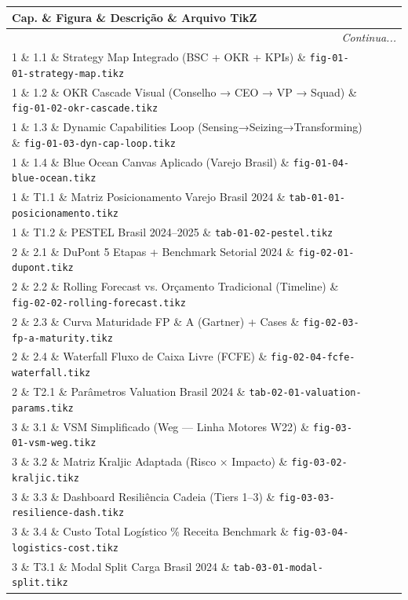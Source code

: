 \begin{longtable}{p{1.5cm}p{4cm}p{5.5cm}p{4cm}}
\toprule
\textbf{Cap.} \& \textbf{Figura} \& \textbf{Descrição} \& \textbf{Arquivo TikZ}\\
\midrule
\endhead
\midrule
\multicolumn{4}{r}{\textit{Continua...}} \\
\endfoot
\bottomrule
\endlastfoot

1 \& 1.1 \& Strategy Map Integrado (BSC + OKR + KPIs) \& \texttt{fig-01-01-strategy-map.tikz}\\
1 \& 1.2 \& OKR Cascade Visual (Conselho → CEO → VP → Squad) \& \texttt{fig-01-02-okr-cascade.tikz}\\
1 \& 1.3 \& Dynamic Capabilities Loop (Sensing→Seizing→Transforming) \& \texttt{fig-01-03-dyn-cap-loop.tikz}\\
1 \& 1.4 \& Blue Ocean Canvas Aplicado (Varejo Brasil) \& \texttt{fig-01-04-blue-ocean.tikz}\\
1 \& T1.1 \& Matriz Posicionamento Varejo Brasil 2024 \& \texttt{tab-01-01-posicionamento.tikz}\\
1 \& T1.2 \& PESTEL Brasil 2024–2025 \& \texttt{tab-01-02-pestel.tikz}\\

2 \& 2.1 \& DuPont 5 Etapas + Benchmark Setorial 2024 \& \texttt{fig-02-01-dupont.tikz}\\
2 \& 2.2 \& Rolling Forecast vs. Orçamento Tradicional (Timeline) \& \texttt{fig-02-02-rolling-forecast.tikz}\\
2 \& 2.3 \& Curva Maturidade FP \& A (Gartner) + Cases  \&  \texttt{fig-02-03-fp-a-maturity.tikz}\\
2 \& 2.4 \& Waterfall Fluxo de Caixa Livre (FCFE) \& \texttt{fig-02-04-fcfe-waterfall.tikz}\\
2 \& T2.1 \& Parâmetros Valuation Brasil 2024 \& \texttt{tab-02-01-valuation-params.tikz}\\

3 \& 3.1 \& VSM Simplificado (Weg — Linha Motores W22) \& \texttt{fig-03-01-vsm-weg.tikz}\\
3 \& 3.2 \& Matriz Kraljic Adaptada (Risco × Impacto) \& \texttt{fig-03-02-kraljic.tikz}\\
3 \& 3.3 \& Dashboard Resiliência Cadeia (Tiers 1–3) \& \texttt{fig-03-03-resilience-dash.tikz}\\
3 \& 3.4 \& Custo Total Logístico \% Receita Benchmark \& \texttt{fig-03-04-logistics-cost.tikz} \\
3 \& T3.1 \& Modal Split Carga Brasil 2024 \& \texttt{tab-03-01-modal-split.tikz}\\


\end{longtable}
